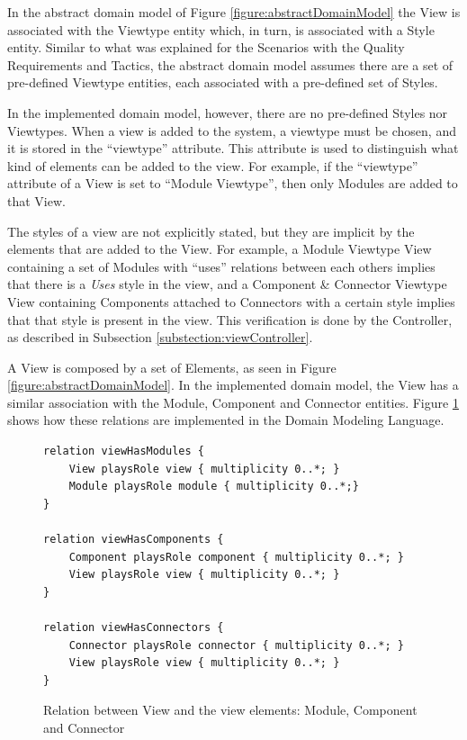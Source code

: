 \documentclass{llncs}
\begin{document}
In the abstract domain model of Figure \ref{figure:abstractDomainModel} the View is associated with the Viewtype entity which, in turn, is associated with a Style entity. Similar to what was explained for the Scenarios with the Quality Requirements and Tactics, the abstract domain model assumes there are a set of pre-defined Viewtype entities, each associated with a pre-defined set of Styles. 

In the implemented domain model, however, there are no pre-defined Styles nor Viewtypes. When a view is added to the system, a viewtype must be chosen, and it is stored in the ``viewtype'' attribute. This attribute is used to distinguish what kind of elements can be added to the view. For example, if the ``viewtype'' attribute of a View is set to ``Module Viewtype'', then only Modules are added to that View. 

The styles of a view are not explicitly stated, but they are implicit by the elements that are added to the View. For example, a Module Viewtype View containing a set of Modules with ``uses'' relations between each others implies that there is a \textit{Uses} style in the view, and a Component \& Connector Viewtype View containing Components attached to Connectors with a certain style implies that that style is present in the view. This verification is done by the Controller, as described in Subsection \ref{substection:viewController}.

A View is composed by a set of Elements, as seen in Figure \ref{figure:abstractDomainModel}. In the implemented domain model, the View has a similar association with the Module, Component and Connector entities. Figure \ref{figure:modelviewelements} shows how these relations are implemented in the Domain Modeling Language.

\begin{figure}
\lstset{style=customjava}
\begin{lstlisting}
relation viewHasModules {
	View playsRole view { multiplicity 0..*; }
	Module playsRole module { multiplicity 0..*;}
}

relation viewHasComponents {
	Component playsRole component { multiplicity 0..*; }
	View playsRole view { multiplicity 0..*; }
}

relation viewHasConnectors {
	Connector playsRole connector { multiplicity 0..*; }
	View playsRole view { multiplicity 0..*; }
}
\end{lstlisting}
\caption{Relation between View and the view elements: Module, Component and Connector}
\label{figure:modelviewelements}
\end{figure}
\end{document}

